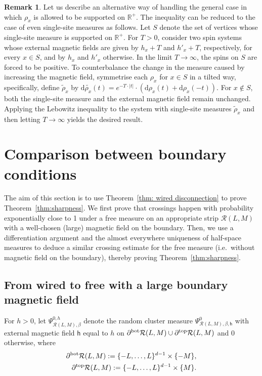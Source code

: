 \documentclass[11pt,a4paper]{article}
\numberwithin{equation}{section}
\theoremstyle{plain}
\theoremstyle{definition}
\newtheorem{Rem}[Thm]{Remark}
\begin{document}
\begin{Rem}
Let us describe an alternative way of handling the general case in which $\rho_x$ is allowed to be supported on $\mathbb{R}^+$. The inequality can be reduced to the case of even single-site measures as follows. Let $S$ denote the set of vertices whose single-site measure is supported on $\mathbb{R}^+$. For $T>0$, consider two spin systems whose external magnetic fields are given by $h_x+T$ and $h'_x+T$, respectively, for every $x\in S$, and by $h_x$ and $h'_x$ otherwise. In the limit $T\to\infty$, the spins on $S$ are forced to be positive. To counterbalance the change in the measure caused by increasing the magnetic field, symmetrise each $\rho_x$ for $x\in S$ in a tilted way, specifically, define $\tilde{\rho}_x$ by $\mathrm{d}\tilde{\rho_x}(t)= e^{-T\cdot |t|}\cdot (\mathrm{d}\rho_x(t)+\mathrm{d}\rho_x(-t))$. For $x\notin S$, both the single-site measure and the external magnetic field remain unchanged. Applying the Lebowitz inequality to the system with single-site measures $\widetilde{\rho}_x$ and then letting $T\to\infty$ yields the desired result.
\end{Rem}





\section{Comparison between boundary conditions}\label{sec:comparison_bc}

The aim of this section is to use Theorem~\ref{thm: wired disconnection} to prove Theorem~\ref{thm:sharpness}. We first prove that crossings happen with probability exponentially close to 1 under a free measure on an appropriate strip $\mathcal{R}(L,M)$ with a well-chosen (large) magnetic field on the boundary. Then, we use a differentiation argument and the almost everywhere uniqueness of half-space measures to deduce a similar crossing estimate for the free measure (i.e.\ without magnetic field on the boundary), thereby proving Theorem~\ref{thm:sharpness}. 

\subsection{From wired to free with a large boundary magnetic field}
For $h>0$, let $\Psi^{0,h}_{\mathcal{R}(L,M),\beta}$ denote the random cluster measure $\Psi^0_{\mathcal{R}(L,M),\beta,\mathsf{h}}$ with external magnetic field $\mathsf{h}$ equal to $h$ on $\partial^{\rm bot} \mathcal{R}(L,M)\cup \partial^{\rm top} \mathcal{R}(L,M)$ and $0$ otherwise, where
\begin{align}
    \partial^{\rm bot} \mathcal{R}(L,M):=\{-L,\ldots,L\}^{d-1}\times \{-M\},  \\ \partial^{\rm top} \mathcal{R}(L,M):= \{-L,\ldots,L\}^{d-1}\times \{M\}.
\end{align}
\end{document}
